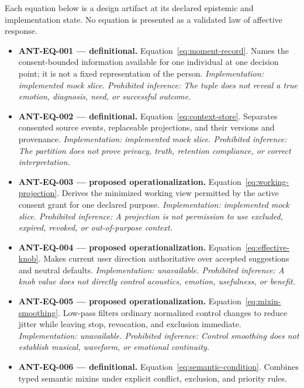 
\noindent Each equation below is a design artifact at its declared epistemic and implementation state. No equation is presented as a validated law of affective response.

\begin{itemize}[leftmargin=1.35em,itemsep=0.72em]
  \item \textbf{ANT-EQ-001 --- definitional.} Equation~\ref{eq:moment-record}. Names the consent-bounded information available for one individual at one decision point; it is not a fixed representation of the person.
  \textit{Implementation: implemented mock slice. Prohibited inference: The tuple does not reveal a true emotion, diagnosis, need, or successful outcome.}
  \item \textbf{ANT-EQ-002 --- definitional.} Equation~\ref{eq:context-store}. Separates consented source events, replaceable projections, and their versions and provenance.
  \textit{Implementation: implemented mock slice. Prohibited inference: The partition does not prove privacy, truth, retention compliance, or correct interpretation.}
  \item \textbf{ANT-EQ-003 --- proposed operationalization.} Equation~\ref{eq:working-projection}. Derives the minimized working view permitted by the active consent grant for one declared purpose.
  \textit{Implementation: implemented mock slice. Prohibited inference: A projection is not permission to use excluded, expired, revoked, or out-of-purpose context.}
  \item \textbf{ANT-EQ-004 --- proposed operationalization.} Equation~\ref{eq:effective-knob}. Makes current user direction authoritative over accepted suggestions and neutral defaults.
  \textit{Implementation: unavailable. Prohibited inference: A knob value does not directly control acoustics, emotion, usefulness, or benefit.}
  \item \textbf{ANT-EQ-005 --- proposed operationalization.} Equation~\ref{eq:mixin-smoothing}. Low-pass filters ordinary normalized control changes to reduce jitter while leaving stop, revocation, and exclusion immediate.
  \textit{Implementation: unavailable. Prohibited inference: Control smoothing does not establish musical, waveform, or emotional continuity.}
  \item \textbf{ANT-EQ-006 --- definitional.} Equation~\ref{eq:semantic-condition}. Combines typed semantic mixins under explicit conflict, exclusion, and priority rules.

\end{itemize}
